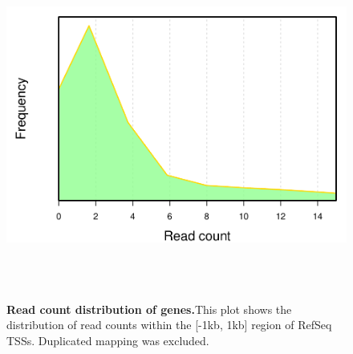 \documentclass{article}
\begin{document}
\begin{center}
\begin{figure}[H]
\includegraphics[width=6.5in, height=4.5in, page=1]{bamchop-chip-tss-gene}
\caption{\textbf{Read count distribution of genes.}This plot shows the distribution of read counts within the [-1kb, 1kb] region of RefSeq TSSs. Duplicated mapping was excluded.}
\end{figure}
\end{center}
\end{document}
